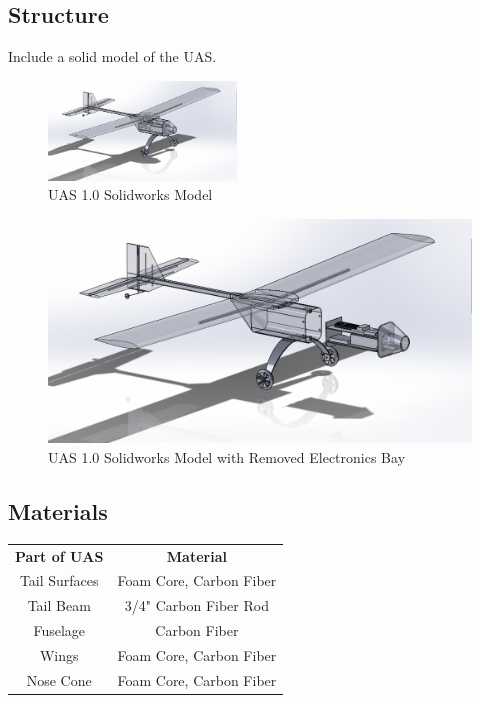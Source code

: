 \documentclass{article}
\begin{document}
\subsection*{Structure}
Include a solid model of the UAS. \\

\begin{figure}[H]
	\includegraphics[width = 5cm]{UAS_1_0_SolidModel.png}
	\caption{UAS 1.0 Solidworks Model}
\end{figure}

\begin{figure}[H]
	\includegraphics[width = \columnwidth]{UAS_1_0_SolidModel_ElecBay.png}
	\caption{UAS 1.0 Solidworks Model with Removed Electronics Bay}
\end{figure}

\subsection*{Materials}

\begin{tabular}{ c c }
	\textbf{Part of UAS} & \textbf{Material}  \\ 
	 Tail Surfaces & Foam Core, Carbon Fiber  \\  
	 Tail Beam & 3/4" Carbon Fiber Rod  \\ 
	 Fuselage & Carbon Fiber  \\  
	 Wings & Foam Core, Carbon Fiber  \\  
	 Nose Cone & Foam Core, Carbon Fiber  \\  
\end{tabular} \\
\end{document}
